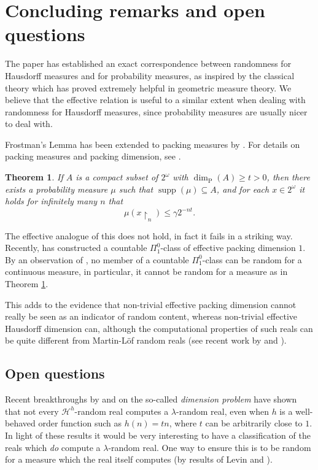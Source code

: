 \documentclass[11pt,reqno]{article}
\theoremstyle{plain}
\newtheorem{thm}{Theorem}
\theoremstyle{definition}
\theoremstyle{remark}
\numberwithin{equation}{section}
\newcommand{\Cant}{\ensuremath{2^{\omega}}}
\newcommand{\Rest}[1]{\ensuremath{\!\restriction_{#1}}}
\newcommand{\Hmeas}{\ensuremath{\mathcal{H}}}
\newcommand{\Hm}[1]{\ensuremath{\Hmeas^{#1}}}
\DeclareMathOperator{\supp}{supp}
\begin{document}
% 
% 
\section{Concluding remarks and open questions} \label{sec-conclusion}
	 
The paper has established an exact correspondence between randomness for Hausdorff measures and for probability measures, as inspired by the classical theory which has proved extremely helpful in geometric measure theory. We believe that the effective relation is useful to a similar extent when dealing with randomness for Hausdorff measures, since probability measures are usually nicer to deal with.

Frostman's Lemma has been extended to packing measures by \citet{cutler:1995}.
For details on packing measures and packing dimension, see \citep{falconer:1990}.

\begin{thm} \label{thm-frost-pack}
	If $A$ is a compact subset of $\Cant$ with $\dim_{\operatorname{P}}(A) \geq t > 0$, then there exists a probability measure $\mu$ such that $\supp(\mu) \subseteq A$, and for each $x \in \Cant$ it holds for infinitely many $n$ that
	\[
		\mu(x\Rest{n}) \leq \gamma 2^{-nt}.
	\]
\end{thm}

The effective analogue of this does not hold, in fact it fails in a striking way. Recently, \citet{conidis:ta} has constructed a countable $\Pi^0_1$-class of effective packing dimension $1$. By an observation of \citet{kjoshanssen-montalban:2005}, no member of a countable $\Pi^0_1$-class can be random for a continuous measure, in particular, it cannot be random for a measure as in Theorem \ref{thm-frost-pack}.

This adds to the evidence that non-trivial effective packing dimension cannot really be seen as an indicator of random content, whereas non-trivial effective Hausdorff dimension can, although the computational properties of such reals can be quite different from Martin-L\"of random reals (see recent work by \citet{miller:draft} and \citet{greenberg-miller:draft}).

	
\subsection*{Open questions}

Recent breakthroughs by \citet{miller:draft} and \citet{greenberg-miller:draft} on the so-called \emph{dimension problem} have shown that not every $\Hm{h}$-random real computes a $\lambda$-random real, even when $h$ is a well-behaved order function such as $h(n) = tn$, where $t$ can be arbitrarily close to $1$. In light of these results it would be very interesting to have a classification of the reals which \emph{do} compute a $\lambda$-random real. One way to ensure this is to be random for a measure which the real itself computes (by results of Levin \citep{zvonkin-levin:1970} and \citet{kautz:1991}). 
\end{document}
